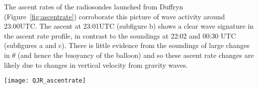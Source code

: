 \documentclass[times]{qjrms4}
\begin{document}
The ascent rates of the radiosondes launched from Duffryn (Figure~\ref{fig:ascentrate}) corroborate this picture of wave activity around 23:00UTC. The ascent at 23:01UTC (subfigure b) shows a clear wave signature in the ascent rate profile, in contrast to the soundings at 22:02 and 00:30 UTC (subfigures a and c). There is little evidence from the soundings of large changes in $\theta$ (and hence the buoyancy of the balloon) and so these ascent rate changes are likely due to changes in vertical velocity from gravity waves.

       \begin{figure*}
        \centering
        \texttt{[image: QJR\_ascentrate]}
        \caption{Radiosonde rate of ascent for profiles launched from Duffryn at 22:02, 23:01 and 00:30 UTC.}
        \label{fig:ascentrate}
        \end{figure*}
\end{document}
